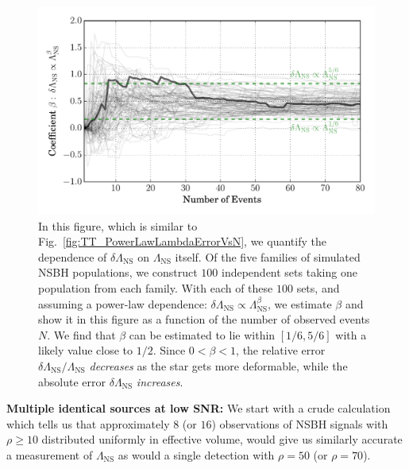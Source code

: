 \documentclass[aps,prd,amsmath,floats,floatfix, twocolumn,
superscriptaddress,nofootinbib,showpacs]{revtex4-1}
\newcommand{\lambdans}{\Lambda_\mathrm{NS}}
\begin{document}
%
% 
\begin{figure}
\centering    
\includegraphics[width=\columnwidth]{plots/PowerLawCoefficient_LambdaErrorvsLambda_vs_N_AllPopulations.pdf}
\caption{%
In this figure, which is similar to Fig.~\ref{fig:TT_PowerLawLambdaErrorVsN},
we quantify the dependence of $\delta\lambdans$ on $\lambdans$ itself. Of 
the five families of simulated NSBH populations, we construct $100$
independent sets taking one population from each family. With each of 
these $100$ sets, and assuming a power-law dependence:
$\delta\lambdans\propto\lambdans^\beta$, we estimate $\beta$ and show it in
this figure as a function of the number of observed events $N$.
% 
We find that $\beta$ can be estimated to lie within $[1/6,5/6]$ with a
likely value close to $1/2$. Since $0<\beta<1$, the relative error
$\delta\lambdans/\lambdans$ {\it decreases} as the star gets more 
deformable, while the absolute error $\delta\lambdans$ {\it increases}.
}
\label{fig:TT_PowerLawLambdaErrorVsLambda}
\end{figure}



\textbf{Multiple identical sources at low SNR: }\label{s2:identical_multiple}
% 
We start with a crude calculation which tells us that approximately $8$ (or $16$) 
observations
of NSBH signals with $\rho\geq 10$ distributed uniformly in effective volume, would
give us similarly accurate a measurement of $\lambdans$ as would a single detection
with $\rho=50$ (or $\rho=70$). 
\end{document}

